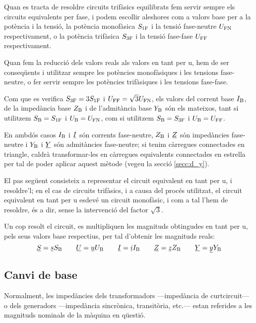 Quan es tracta de resoldre circuits trifàsics equilibrats fem servir sempre els circuits equivalents per fase, i podem escollir aleshores com a valors base per a la potència i la tensió, la potència monofàsica $S_\mathrm{1F}$ i la tensió fase-neutre $U_\mathrm{FN}$ respectivament, o la potència trifàsica $S_\mathrm{3F}$ i la tensió fase-fase $U_\mathrm{FF}$ respectivament.


 Quan fem la reducció dels valors reals als valors en tant per u, hem de ser conseqüents i utilitzar sempre les potències monofàsiques i les tensions fase-neutre, o fer servir sempre les potències trifàsiques i les tensions fase-fase.

 Com que es verifica $S_\mathrm{3F}=3 S_\mathrm{1F}$ i $U_\mathrm{FF}=\sqrt{3}U_\mathrm{FN}$, els valors  del corrent base $I_\mathrm{B}$, de la impedància base $Z_\mathrm{B}$ i  de l'admitància base $Y_\mathrm{B}$ són els mateixos, tant si utilitzem $S_\mathrm{B}=S_\mathrm{1F}$ i $U_\mathrm{B}=U_\mathrm{FN}$, com si utilitzem $S_\mathrm{B}=S_\mathrm{3F}$ i $U_\mathrm{B}=U_\mathrm{FF}$.

 En ambdós casos $I_\mathrm{B}$ i $\cmplx{I}$ són corrents fase-neutre, $Z_\mathrm{B}$ i $\cmplx{Z}$ són impedàncies  fase-neutre i $Y_\mathrm{B}$ i $\cmplx{Y}$ són admitàncies fase-neutre; si tenim càrregues connectades en triangle, caldrà transformar-les en càrregues equivalents connectades en estrella per tal de poder aplicar aquest mètode (vegeu la secció \ref{secc:d_y}).

El pas següent consisteix a representar el circuit equivalent en tant
per u, i resoldre'l; en el cas de circuits trifàsics, i a causa del procés utilitzat, el circuit equivalent en tant per u esdevé un circuit monofàsic, i com a tal l'hem de resoldre, és a dir, sense la intervenció del factor $\sqrt{3}$.

Un cop resolt el circuit, es multipliquen les magnituds obtingudes en tant per u, pels
seus valors base respectius, per tal d'obtenir les magnituds reals:
\begin{equation}
   \cmplx{S} = \cmplx{s} S\ped{B} \qquad \cmplx{U} = \cmplx{u} U\ped{B} \qquad \cmplx{I} = \cmplx{i} I\ped{B} \qquad \cmplx{Z} = \cmplx{z} Z\ped{B} \qquad \cmplx{Y} = \cmplx{y} Y\ped{B}
\end{equation}

\subsection{Canvi de base}\label{sec:canvi-base} 

Normalment, les impedàncies dels transformadors ---impedància de curtcircuit--- o dels generadors ---impedància sincrònica, transitòria, etc.--- estan referides a les magnituds nominals de la màquina en qüestió.


